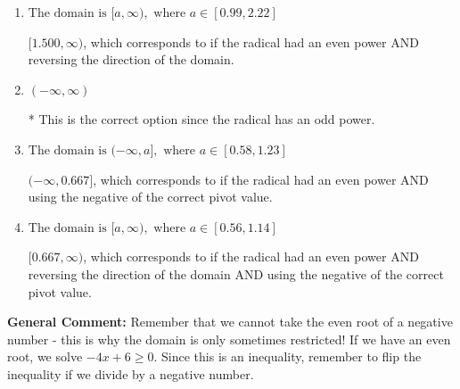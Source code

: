 \documentclass{extbook}[14pt]
\begin{document}
\begin{enumerate}
{\begin{enumerate}[label=\Alph*.]
$(-\infty, 1.500]$, which corresponds to if the radical had an even power.
\item \( \text{The domain is } [a, \infty), \text{   where } a \in [0.99, 2.22] \)

$[1.500, \infty)$, which corresponds to if the radical had an even power AND reversing the direction of the domain.
\item \( (-\infty, \infty) \)

* This is the correct option since the radical has an odd power.
\item \( \text{The domain is } (-\infty, a], \text{   where } a \in [0.58, 1.23] \)

$(-\infty, 0.667]$, which corresponds to if the radical had an even power AND using the negative of the correct pivot value.
\item \( \text{The domain is } [a, \infty), \text{   where } a \in [0.56, 1.14] \)

$[0.667, \infty)$, which corresponds to if the radical had an even power AND reversing the direction of the domain AND using the negative of the correct pivot value.
\end{enumerate}

\textbf{General Comment:} Remember that we cannot take the even root of a negative number - this is why the domain is only sometimes restricted! If we have an even root, we solve $-4 x + 6 \geq 0$. Since this is an inequality, remember to flip the inequality if we divide by a negative number.
}
\end{enumerate}
\end{document}
